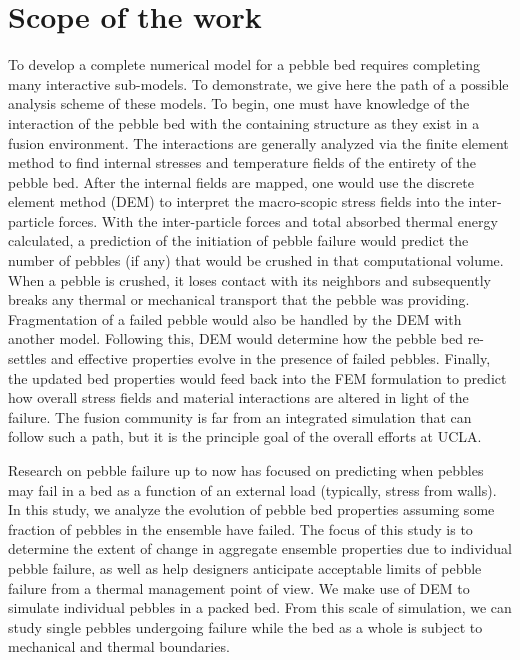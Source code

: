 \section{Scope of the work}\label{sec:intro-scope-of-work}


To develop a complete numerical model for a pebble bed requires completing many interactive sub-models. To demonstrate, we give here the path of a possible analysis scheme of these models. To begin, one must have knowledge of the interaction of the pebble bed with the containing structure as they exist in a fusion environment. The interactions are generally analyzed via the finite element method to find internal stresses and temperature fields of the entirety of the pebble bed. After the internal fields are mapped, one would use the discrete element method (DEM) to interpret the macro-scopic stress fields into the inter-particle forces. With the inter-particle forces and total absorbed thermal energy calculated, a prediction of the initiation of pebble failure would predict the number of pebbles (if any) that would be crushed in that computational volume. When a pebble is crushed, it loses contact with its neighbors and subsequently breaks any thermal or mechanical transport that the pebble was providing. Fragmentation of a failed pebble would also be handled by the DEM with another model. Following this, DEM would determine how the pebble bed re-settles and effective properties evolve in the presence of failed pebbles. 
Finally, the updated bed properties would feed back into the FEM formulation to predict how overall stress fields and material interactions are altered in light of the failure. The fusion community is far from an integrated simulation that can follow such a path, but it is the principle goal of the overall efforts at UCLA.

Research on pebble failure up to now has focused on predicting when pebbles may fail in a bed as a function of an external load (typically, stress from walls). In this study, we analyze the evolution of pebble bed properties assuming some fraction of pebbles in the ensemble have failed. The focus of this study is to determine the extent of change in aggregate ensemble properties due to individual pebble failure, as well as help designers anticipate acceptable limits of pebble failure from a thermal management point of view. We make use of DEM to simulate individual pebbles in a packed bed. From this scale of simulation, we can study single pebbles undergoing failure while the bed as a whole is subject to mechanical and thermal boundaries.

